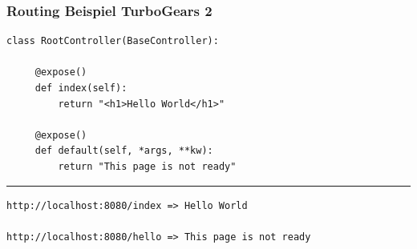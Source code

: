 \documentclass[
    t,
    smaller,
    compress,
    xcolor=svgnames,            %
    table,
]{beamer}
\begin{document}
\begin{frame}[fragile]

\frametitle{Routing Beispiel TurboGears 2}

\begin{lstlisting}
class RootController(BaseController):

     @expose()
     def index(self):
         return "<h1>Hello World</h1>"

     @expose()
     def default(self, *args, **kw):
         return "This page is not ready"
\end{lstlisting}
\hrule
    \vspace{10pt}
\begin{lstlisting}
http://localhost:8080/index => Hello World

http://localhost:8080/hello => This page is not ready
\end{lstlisting}


\end{frame}

%
\end{document}
